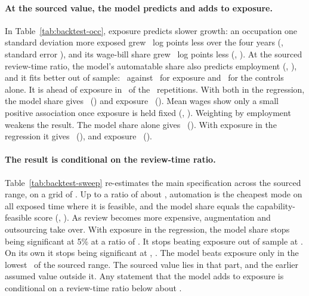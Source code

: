 

\paragraph{At the sourced value, the model predicts and adds to exposure.} In Table~\ref{tab:backtest-occ}, exposure predicts slower growth: an occupation one standard deviation more exposed grew \btEAloneLp\ log points less over the four years (\btEAloneB, standard error \btEAloneSe), and its wage-bill share grew \btEWbsLp\ log points less (\btEWbsB, \btEWbsSe). At the sourced review-time ratio, the model's automatable share also predicts employment (\btMAloneB, \btMAloneSe), and it fits better out of sample: \btCvM\ against \btCvE\ for exposure and \btCvC\ for the controls alone. It is ahead of exposure in \btRepsMBeatsE\ of the \btReps\ repetitions. With both in the regression, the model share gives \btMJointB\ (\btMJointSe) and exposure \btEJointB\ (\btEJointSe). Mean wages show only a small positive association once exposure is held fixed (\btMWageB, \btMWageSe). Weighting by employment weakens the result. The model share alone gives \btMWB\ (\btMWSe). With exposure in the regression it gives \btMWJB\ (\btMWJSe), and exposure \btEWJB\ (\btEWJSe).



\paragraph{The result is conditional on the review-time ratio.} Table~\ref{tab:backtest-sweep} re-estimates the main specification across the sourced range, on a grid of \btGridStep. Up to a ratio of about \btRhoSat, automation is the cheapest mode on all exposed time where it is feasible, and the model share equals the capability-feasible score (\btSwLoB, \btSwLoSe). As review becomes more expensive, augmentation and outsourcing take over. With exposure in the regression, the model share stops being significant at 5\% at a ratio of \btRhoStarJoint. It stops beating exposure out of sample at \btRhoStarCv. On its own it stops being significant at \btRhoStarAlone, \btSweepMonotone. The model beats exposure only in the lowest \btRangeShareCv\ of the sourced range. The sourced value lies in that part, and the earlier assumed value outside it. Any statement that the model adds to exposure is conditional on a review-time ratio below about \btRhoStarCv.




